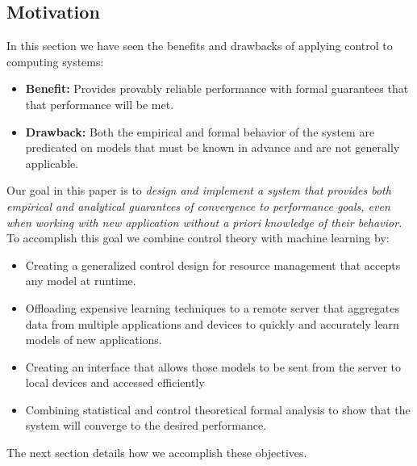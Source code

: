 \subsection{Motivation}
In this section we have seen the benefits and drawbacks of applying
control to computing systems:
\begin{itemize}
\item {\bf Benefit:} Provides provably reliable performance with
  formal guarantees that that performance will be met.
\item {\bf Drawback:} Both the empirical and formal behavior of the
  system are predicated on models that must be known in advance and
  are not generally applicable.
\end{itemize}

Our goal in this paper is to \emph{design and implement a system that
  provides both empirical and analytical guarantees of convergence to
  performance goals, even when working with new application without a
  priori knowledge of their behavior.}  To accomplish this goal we
combine control theory with machine learning by:
\begin{itemize}
\item Creating a generalized control design for resource management
  that accepts any model at runtime.
\item Offloading expensive learning techniques to a remote server that
  aggregates data from multiple applications and devices to quickly
  and accurately learn models of new applications.
\item Creating an interface that allows those models to be sent from
  the server to local devices and accessed efficiently
\item Combining statistical and control theoretical formal analysis to
  show that the system will converge to the desired performance.
\end{itemize}
The next section details how we accomplish these objectives.
